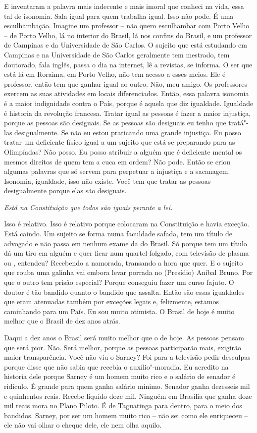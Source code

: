 E inventaram a palavra mais indecente e mais imoral que conheci na vida,
essa tal de isonomia. Sala igual para quem trabalha igual. Isso não
pode. É uma esculhambação. Imagine um professor -- não quero esculhambar
com Porto Velho -- de Porto Velho, lá no interior do Brasil, lá nos
confins do Brasil, e um professor de Campinas e da Universidade de São
Carlos. O sujeito que está estudando em Campinas e na Universidade de
São Carlos geralmente tem mestrado, tem doutorado, fala inglês, passa o
dia na internet, lê a revistas, se informa. O ser que está lá em
Roraima, em Porto Velho, não tem acesso a esses meios. Ele é professor,
então tem que ganhar igual ao outro. Não, meu amigo. Os professores
exercem as suas atividades em locais diferenciados. Então, essa palavra
isonomia é a maior indignidade contra o País, porque é aquela que diz
igualdade. Igualdade é historia da revolução francesa. Tratar igual as
pessoas é fazer a maior injustiça, porque as pessoas são desiguais. Se
as pessoas são desiguais eu tenho que tratá"-las desigualmente. Se não eu
estou praticando uma grande injustiça. Eu posso tratar um deficiente
físico igual a um sujeito que está se preparando para as Olimpíadas? Não
posso. Eu posso atribuir a alguém que é deficiente mental os mesmos
direitos de quem tem a cuca em ordem? Não pode. Então se criou algumas
palavras que só servem para perpetuar a injustiça e a sacanagem.
Isonomia, igualdade, isso não existe. Você tem que tratar as pessoas
desigualmente porque elas são desiguais.

\medskip

\noindent\emph{Está na Constituição que todos são iguais perante a lei.}

Isso é relativo. Isso é relativo porque colocaram na
Constituição e havia exceção. Está caindo. Um sujeito se forma numa
faculdade safada, tem um título de advogado e não passa em nenhum exame
da  do Brasil. Só porque tem um título dá um tiro em alguém e quer
ficar num quartel folgado, com televisão de plasma ou , entendeu?
Recebendo a namorada, transando a hora que quer. E o sujeito que rouba
uma galinha vai embora levar porrada no (Presídio) Aníbal Bruno. Por que
o outro tem prisão especial? Porque conseguiu fazer um curso fajuto. O
doutor é tão bandido quanto o bandido que assalta. Então são essas
igualdades que eram atenuadas também por exceções legais e, felizmente,
estamos caminhando para um País. Eu sou muito otimista. O Brasil de hoje
é muito melhor que o Brasil de dez anos atrás.

Daqui a dez anos o Brasil será muito melhor que o de hoje. As pessoas
pensam que será pior. Não. Será melhor, porque as pessoas participarão
mais, exigirão maior transparência. Você não viu o Sarney? Foi para a
televisão pedir desculpas porque disse que não sabia que recebia o
auxílio"-moradia. Eu acredito na historia dele porque Sarney é um homem
muito rico e o salário de senador é ridículo. É grande para quem ganha
salário mínimo. Senador ganha dezesseis mil e quinhentos reais. Recebe
líquido doze mil. Ninguém em Brasília que ganha doze mil reais mora no
Plano Piloto. É de Taguatinga para dentro, para o meio dos bandidos.
Sarney, por ser um homem muito rico -- não sei como ele enriqueceu --
ele não vai olhar o cheque dele, ele nem olha aquilo.

